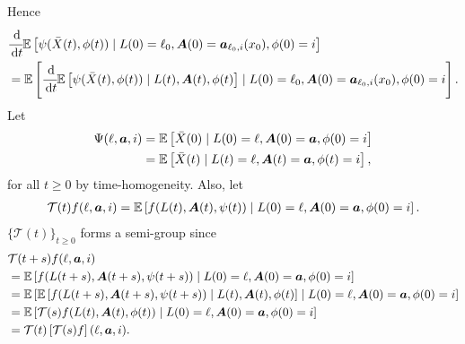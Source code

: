 Hence 
\begin{align}
	&\cfrac{\, \mathrm{d}}{\, \mathrm{d} t}\mathbb E\left[\psi(\bar X(t),\phi(t))  \mid L(0)=\ell_0, \boldsymbol A(0)=\boldsymbol  a_{\ell_0,i}(x_0), \phi(0)=i \right]
	\\&=\mathbb E\left[ \cfrac{\, \mathrm{d}}{\, \mathrm{d} t} \mathbb E\left[\psi(\bar X(t),\phi(t))  \mid L(t), \boldsymbol A(t), \phi(t) \right] \mid L(0)=\ell_0, \boldsymbol A(0)=\boldsymbol  a_{\ell_0,i}(x_0), \phi(0)=i \right].
\end{align}
Let 
\begin{align}
	\Psi(\ell, \boldsymbol a, i) &= \mathbb E\left[\bar X(0) \mid L(0)=\ell, \boldsymbol A(0)=\boldsymbol a, \phi(0)=i \right]
	\\&=\mathbb E\left[\bar X(t) \mid L(t)=\ell, \boldsymbol A(t)=\boldsymbol a, \phi(t)=i \right],
\end{align}
for all \(t\geq0\) by time-homogeneity. Also, let 
\begin{align}
	\mathcal T(t)f(\ell,\boldsymbol a, i) = \mathbb E\left[ f(L(t),\boldsymbol A(t), \psi(t)) \mid L(0)=\ell, \boldsymbol A(0)=\boldsymbol a, \phi(0)=i \right].
\end{align}
\(\{\mathcal T(t)\}_{t\geq 0}\) forms a semi-group since 
\begin{align*}
	&\mathcal T(t+s)f(\ell,\boldsymbol a, i) 
	\\&=\mathbb E\left[ f(L(t+s),\boldsymbol A(t+s), \psi(t+s)) \mid L(0)=\ell, \boldsymbol A(0)=\boldsymbol a, \phi(0)=i  \right]
	\\&=\mathbb E\left[ \mathbb E\left[ f(L(t+s),\boldsymbol A(t+s), \psi(t+s)) \mid L(t), \boldsymbol A(t), \phi(t) \right] \mid L(0)=\ell, \boldsymbol A(0)=\boldsymbol a, \phi(0)=i \right]
	\\&=\mathbb E\left[ \mathcal T(s)f(L(t), \boldsymbol A(t), \phi(t))\mid L(0)=\ell, \boldsymbol A(0)=\boldsymbol a, \phi(0)=i \right]
	\\&=\mathcal T(t) \left[\mathcal T(s)f \right](\ell, \boldsymbol a, i).
\end{align*}

